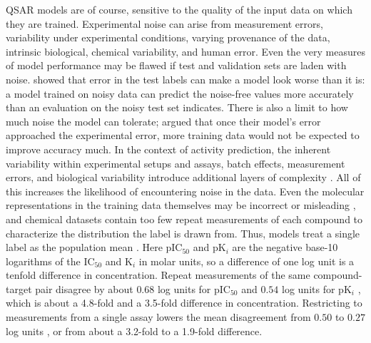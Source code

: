 QSAR models are of course, sensitive to the quality of the input data on which they are trained. Experimental noise can arise from measurement errors, variability under experimental conditions, varying provenance of the data, intrinsic biological, chemical variability, and human error. Even the very measures of model performance may be flawed if test and validation sets are laden with noise. \citet{Kolmar2021} showed that error in the test labels can make a model look worse than it is: a model trained on noisy data can predict the noise-free values more accurately than an evaluation on the noisy test set indicates. There is also a limit to how much noise the model can tolerate; \citet{jorner2021} argued that once their model's error approached the experimental error, more training data would not be expected to improve accuracy much. In the context of activity prediction, the inherent variability within experimental setups and assays, batch effects, measurement errors, and biological variability introduce additional layers of complexity \citep{Kolmar2021, Kramer2012, Kalliokoski2013}. All of this increases the likelihood of encountering noise in the data. Even the molecular representations in the training data themselves may be incorrect or misleading \citep{Fourches2010, Walters2023}, and chemical datasets contain too few repeat measurements of each compound to characterize the distribution the label is drawn from. Thus, models treat a single label as the population mean \citep{Kolmar2021}. Here pIC$_{50}$ and pK$_i$ are the negative base-10 logarithms of the IC$_{50}$ and K$_i$ in molar units, so a difference of one log unit is a tenfold difference in concentration. Repeat measurements of the same compound-target pair disagree by about $0.68$ log units for pIC$_{50}$ and $0.54$ log units for pK$_i$ \citep{Kalliokoski2013, Kramer2012}, which is about a 4.8-fold and a 3.5-fold difference in concentration. Restricting to measurements from a single assay lowers the mean disagreement from $0.50$ to $0.27$ log units \citep{landrum2024}, or from about a 3.2-fold to a 1.9-fold difference.


